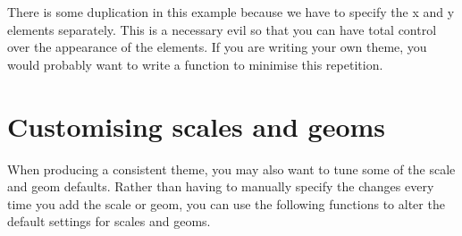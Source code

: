 % 


There is some duplication in this example because we have to specify the x and y elements separately.  This is a necessary evil so that you can have total control over the appearance of the elements.  If you are writing your own theme, you would probably want to write a function to minimise this repetition.

% 
% 
% 
% 
% 

\section{Customising scales and geoms}
\label{sec:theme-scale-geom}

When producing a consistent theme, you may also want to tune some of the scale and geom defaults.  Rather than having to manually specify the changes every time you add the scale or geom, you can use the following functions to alter the default settings for scales and geoms. 

